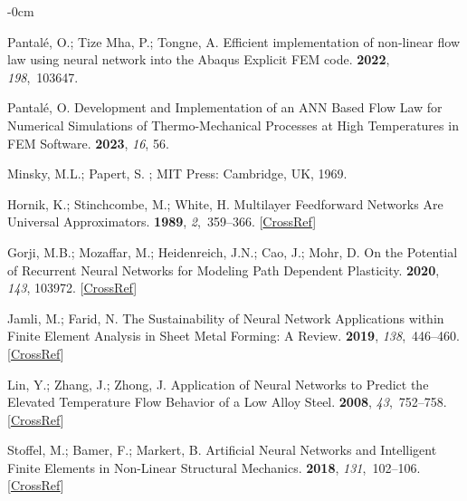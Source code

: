\documentclass[algorithms,article,accept,pdftex,oneauthor]{Definitions/mdpi}
\begin{document}
\begin{adjustwidth}{-\extralength}{0cm}
\begin{thebibliography}{999}
Pantalé, O.; {Tize Mha}, P.; Tongne, A.
\newblock Efficient implementation of non-linear flow law using neural network
into the Abaqus Explicit FEM code.
 {\bf 2022}, {\em
198},~103647.

Pantalé, O.
\newblock Development and Implementation of an ANN Based Flow Law for Numerical
Simulations of Thermo-Mechanical Processes at High Temperatures in FEM
Software.
 {\bf 2023}, {\em 16}, 56.

Minsky, M.L.; Papert, S.
;
MIT Press: Cambridge, UK, 
1969.

Hornik, K.; Stinchcombe, M.; White, H.
\newblock Multilayer Feedforward Networks Are Universal Approximators.
 {\bf 1989}, {\em 2},~359--366. [\href{http://dx.doi.org/10.1016/0893-6080(89)90020-8}{CrossRef}]

Gorji, M.B.; Mozaffar, M.; Heidenreich, J.N.; Cao, J.; Mohr, D.
\newblock On the Potential of Recurrent Neural Networks for Modeling Path
Dependent Plasticity.
 {\bf 2020}, {\em
143}, 103972. [\href{http://dx.doi.org/10.1016/j.jmps.2020.103972}{CrossRef}]

Jamli, M.; Farid, N.
\newblock The Sustainability of Neural Network Applications within Finite
Element Analysis in Sheet Metal Forming:  A Review.
 {\bf 2019}, {\em 138},~446--460. [\href{http://dx.doi.org/10.1016/j.measurement.2019.02.034}{CrossRef}]

Lin, Y.; Zhang, J.; Zhong, J.
\newblock Application of Neural Networks to Predict the Elevated Temperature
Flow Behavior of a Low Alloy Steel.
 {\bf 2008}, {\em 43},~752--758. [\href{http://dx.doi.org/10.1016/j.commatsci.2008.01.039}{CrossRef}]

Stoffel, M.; Bamer, F.; Markert, B.
\newblock Artificial Neural Networks and Intelligent Finite Elements in
Non-Linear Structural Mechanics.
 {\bf 2018}, {\em 131},~102--106. [\href{http://dx.doi.org/10.1016/j.tws.2018.06.035}{CrossRef}]


\end{thebibliography}
\end{adjustwidth}
\end{document}
